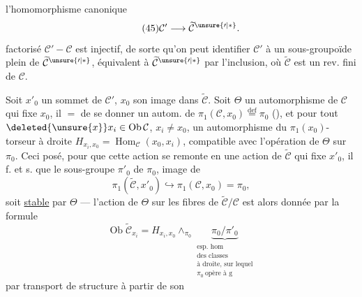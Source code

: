 l'homomorphisme canonique
\[
\tag{45}\mathcal C'\longrightarrow\widetilde{\mathcal C}^{\unsure{\prime|*}}.
\]
 factorisé $\mathcal C'-\mathcal C$ est injectif, de sorte qu'on peut identifier $\mathcal C'$ à un sous-groupoïde plein de $\widetilde{\mathcal C}^{\unsure{\prime|*}}$, équivalent à $\widetilde{\mathcal C}^{\unsure{\prime|*}}$ par l'inclusion, où $\widetilde{\mathcal C}$ est un rev. fini de $\mathcal C$.

Soit $x'_0$ un sommet de $\mathcal C'$, $x_0$ son image dans $\widetilde{\mathcal C}$. Soit $\Theta$ un automorphisme de $\mathcal C$ qui fixe $x_0$, il   $=$ de se donner un autom. de  $\pi_1(\mathcal C,x_0)\overset{\mathrm{def}}{=}\pi_0$ (), et pour tout  $\deleted{\unsure{x}}x_i\in\operatorname{Ob}\mathcal C$, $x_i\ne x_0$, un automorphisme du $\pi_1(x_0)$-torseur à droite $H_{x_i,x_0}=\operatorname{Hom}_{\mathcal C}(x_0,x_i)$, compatible avec l'opération de $\Theta$ sur $\pi_0$. Ceci posé, pour que cette action se remonte en une action de $\widetilde{\mathcal C}$ qui fixe $x'_0$, il f. et s. que le sous-groupe $\pi'_0$ de $\pi_0$, image de 
\[
\pi_1(\widetilde{\mathcal C},x'_0)\hookrightarrow\pi_1(\mathcal C,x_0)=\pi_0,
\]
soit \uline{stable} par $\Theta$ --- l'action de $\Theta$ sur les fibres  de $\widetilde{\mathcal C}/\mathcal C$ est alors donnée par la formule
\[
\tag{45}\operatorname{Ob}\widetilde{\mathcal C}_{x_i}=H_{x_i,x_0}\wedge_{\pi_0}\underbrace{\pi_0/\pi'_0}_{\substack{\text{esp. hom}\\\text{des classes}\\\text{à droite, sur lequel}\\\pi_0\ \text{opère à g}}}
\]
par transport de structure à partir de son

